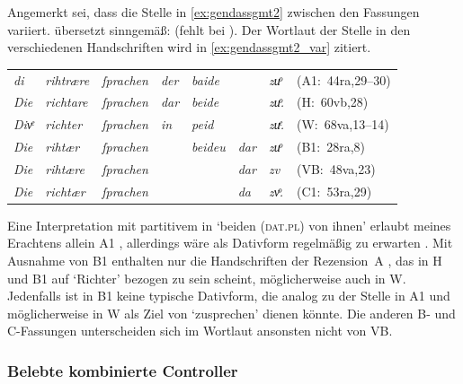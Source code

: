 Angemerkt sei, dass die Stelle in \cref{ex:gendassgmt2} zwischen den Fassungen
variiert. \citet[244]{myers2013} übersetzt sinngemäß:  (fehlt bei \cite[177--178]{mayer1874}).
Der Wortlaut der Stelle in den verschiedenen Handschriften wird in
\cref{ex:gendassgmt2_var} zitiert.

\begin{exe}
\ex \label{ex:gendassgmt2_var}
	\begin{tabular}[t]{
	@{}
	>{\itshape}l @{~}
	>{\itshape}l @{~}
	>{\itshape}l @{~}
	>{\itshape}l @{~}
	>{\itshape}l @{~}
	>{\itshape}l @{~}
	>{\itshape}l
	l
	@{}
}
di
	& rihtrære
	& ſprachen
	& der
	& baide
	& %
	& zuͦ
	& (A1:~44ra,29--30)
	\\

Die
	& richtare
	& ſprachen
	& dar
	& beide
	& %
	& zuͦ.
	& (H:~60vb,28)
	\\

Divͤ
	& richter
	& ſprachen
	& in
	& peid
	& %
	& zuͤ.
	& (W:~68va,13--14)
	\\

Die
	& rihtær
	& ſprachen
	& %
	& beideu
	& dar
	& zuͦ
	& (B1:~28ra,8)
	\\

Die
	& rihtære
	& ſprachen
	& %
	& %
	& dar
	& zv
	& (VB:~48va,23)
	\\

Die
	& richtær
	& ſprachen
	& %
	& %
	& da
	& zvͦ.
	& (C1:~53ra,29)
	\\
\end{tabular}
\end{exe}

Eine Interpretation mit partitivem  in  `beiden
(\textsc{dat.pl}) von ihnen' erlaubt meines Erachtens allein A1
\autocite[vgl.][s.\,v.~\textit{zuo sprëchen}]{lexer:mhdhwb}, allerdings wäre als
Dativform regelmäßig  zu erwarten \autocite[182]{ksw2}. Mit
Ausnahme von B1 enthalten nur die Handschriften der Rezension~A ,
das in H und B1 auf  `Richter' bezogen zu sein scheint,
möglicherweise auch in W. Jedenfalls ist  in B1 keine typische
Dativform, die analog zu der Stelle in A1 und möglicherweise in W als Ziel von
 `zusprechen' dienen könnte. Die anderen B- und C-Fassungen
unterscheiden sich im Wortlaut ansonsten nicht von VB.

\subsubsection{Belebte kombinierte Controller}
\label{subsubsec:x+x_dir_anim}

